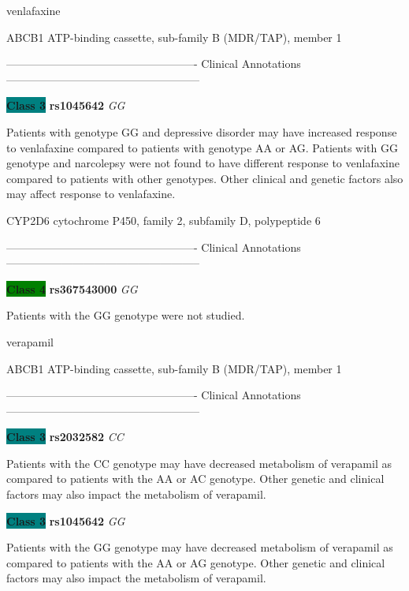 \documentclass{resume} %
\begin{document}
\begin{rSection}{ venlafaxine }
\begin{rSubsection}{ ABCB1 }{ ATP-binding cassette, sub-family B (MDR/TAP), member 1 }{}{}
\item[]

\item[] ---------------------------------------------------- Clinical Annotations -----------------------------------------------------\newline
\item \textbf{\colorbox{teal} {Class 3}} \textbf{ rs1045642 } \textit{ GG }
\item[] Patients with genotype GG and depressive disorder may have increased response to venlafaxine compared to patients with genotype AA or AG. Patients with GG genotype and narcolepsy were not found to have different response to venlafaxine compared to patients with other genotypes. Other clinical and genetic factors also may affect response to venlafaxine.
\end{rSubsection}\begin{rSubsection}{ CYP2D6 }{ cytochrome P450, family 2, subfamily D, polypeptide 6 }{}{}
\item[]

\item[] ---------------------------------------------------- Clinical Annotations -----------------------------------------------------\newline
\item \textbf{\colorbox{green} {Class 4}} \textbf{ rs367543000 } \textit{ GG }
\item[] Patients with the GG genotype were not studied.
\end{rSubsection}

\end{rSection}\begin{rSection}{ verapamil }
\item[]

\begin{rSubsection}{ ABCB1 }{ ATP-binding cassette, sub-family B (MDR/TAP), member 1 }{}{}
\item[]

\item[] ---------------------------------------------------- Clinical Annotations -----------------------------------------------------\newline
\item \textbf{\colorbox{teal} {Class 3}} \textbf{ rs2032582 } \textit{ CC }
\item[] Patients with the CC genotype may have decreased metabolism of verapamil as compared to patients with the AA or AC genotype. Other genetic and clinical factors may also impact the metabolism of verapamil.\item \textbf{\colorbox{teal} {Class 3}} \textbf{ rs1045642 } \textit{ GG }
\item[] Patients with the GG genotype may have decreased metabolism of verapamil as compared to patients with the AA or AG genotype. Other genetic and clinical factors may also impact the metabolism of verapamil.
\end{rSubsection}


\end{rSection}
\end{document}
